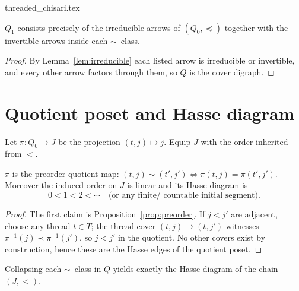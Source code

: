 \begin{filecontents*}{threaded_chisari.tex}
    \begin{proposition}\label{prop:chisari}
    $Q_1$ consists precisely of the irreducible arrows of $(Q_0,\preccurlyeq)$ 
    together with the invertible arrows inside each $\sim$–class.
    \end{proposition}
    
    \begin{proof}
    By Lemma~\ref{lem:irreducible} each listed arrow is irreducible or invertible, 
    and every other arrow factors through them, so $Q$ is the cover digraph.
    \end{proof}
    
    \section{Quotient poset and Hasse diagram}
    
    \begin{definition}[Quotient]\label{def:quotient}
    Let $\pi:Q_0\to J$ be the projection $(t,j)\mapsto j$.
    Equip $J$ with the order inherited from $<$.
    \end{definition}
    
    \begin{proposition}\label{prop:quotient}
    $\pi$ is the preorder quotient map:
    \(
      (t,j)\sim(t',j') \Longleftrightarrow \pi(t,j)=\pi(t',j').
    \)
    Moreover the induced order on $J$ is linear and its Hasse diagram is
    \[
      0<1<2<\cdots \quad\text{(or any finite/ countable initial segment)}.
    \]
    \end{proposition}
    
    \begin{proof}
    The first claim is Proposition~\ref{prop:preorder}.
    If $j<j'$ are adjacent, choose any thread $t\in T$;
    the thread cover $(t,j)\to(t,j')$ witnesses $\pi^{-1}(j)\prec\pi^{-1}(j')$,
    so $j<j'$ in the quotient.  No other covers exist by construction,
    hence these are the Hasse edges of the quotient poset.
    \end{proof}
    
    \begin{corollary}
    Collapsing each $\sim$–class in $Q$ yields exactly the Hasse diagram of the chain $(J,<)$.
    \end{corollary}
    

\end{filecontents*}
